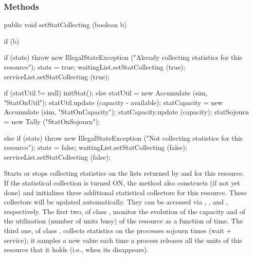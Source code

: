 \subsubsection* {Methods}
\begin{code}

   public void setStatCollecting (boolean b) \begin{hide} {
      if (b) {
         if (stats)
            throw new IllegalStateException ("Already collecting statistics for this resource");
         stats = true;
         waitingList.setStatCollecting (true);
         serviceList.setStatCollecting (true);
         
         if (statUtil != null)
            initStat();
         else {
            statUtil = new Accumulate (sim, "StatOnUtil");
            statUtil.update (capacity - available);
            statCapacity = new Accumulate (sim, "StatOnCapacity");
            statCapacity.update (capacity);
            statSojourn = new Tally ("StatOnSojourn");
         }
      }
      else {
         if (stats)
           throw new IllegalStateException ("Not collecting statistics for this resource");
         stats = false;
         waitingList.setStatCollecting (false);
         serviceList.setStatCollecting (false);
      }
   }\end{hide}
\end{code}
\begin{tabb}  Starts or stops collecting statistics on the lists returned
  by  and  for this resource.
  If the statistical collection is turned ON, the method
  also constructs (if not yet done) 
  and initializes three additional statistical
  collectors for this resource.  These collectors will be updated
  automatically.  They can be accessed via ,
  , and , respectively.
  The first two, of class
   ,
   monitor the evolution of the
  capacity and of the utilization (number of units busy) of the resource 
  as a function of time.
  The third one, of class ,
  collects statistics on the 
  processes sojourn times (wait + service);  it samples a new value
  each time a process releases all the units of this resource that it
  holds (i.e., when its  disappears).
\end{tabb}
\begin{htmlonly}
\end{htmlonly}
